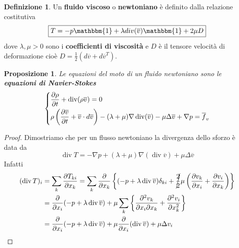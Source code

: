 \documentclass{book}
\theoremstyle{plain}
\theoremstyle{plain}
\theoremstyle{plain}
\theoremstyle{plain}
\theoremstyle{plain}
\newtheorem{prop}{Proposizione}[chapter]
\theoremstyle{definition}
\newtheorem{defi}{Definizione}[chapter]
\theoremstyle{remark}
\theoremstyle{definition}
\begin{document}
\begin{defi}
    Un \textbf{fluido viscoso} o \textbf{newtoniano} è definito dalla relazione costitutiva
    \begin{displaymath}
    \boxed{
        T=-p\mathbbm{1} + \lambda div(\overline{v})\mathbbm{1}+2\mu D
        }
    \end{displaymath}
    dove $\lambda, \mu >0$ sono i \textbf{coefficienti di viscosità} e $D$ è il tensore velocità di deformazione cioè $D=\frac{1}{2}(d\overline{v}+d\overline{v}^T)$.
\end{defi}

\begin{prop}
     Le equazioni del moto di un fluido newtoniano sono le \textbf{equazioni di Navier-Stokes}
     \begin{displaymath}
         \begin{dcases}
            \frac{\partial\rho}{\partial t} + \operatorname{div}(\rho\overline{v})=0\\
            \rho\left(\frac{\partial\overline{v}}{\partial t}+\overline{v}\cdot d\overline{v}\right) -(\lambda+\mu)\nabla \operatorname{div}(\overline{v}) -\mu\Delta\overline{v} +\nabla p = \overline{f}_v
        \end{dcases}
     \end{displaymath}
\end{prop}

\begin{proof}
    Dimostriamo che per un flusso newtoniano la divergenza dello sforzo è data da
    \begin{displaymath}
        \operatorname{div}T=-\nabla p+(\lambda+\mu)\nabla(\operatorname{div}\overline{v})+\mu\Delta\overline{v}
    \end{displaymath}
    Infatti
    \[
    \begin{split}
        (\operatorname{div}T)_i&=\sum_k\frac{\partial T_{ki}}{\partial x_k}=\sum_k\frac{\partial}{\partial x_k}\left\{(-p+\lambda\operatorname{div}\overline{v})\delta_{ki}+\cancel{\frac{2}{2}}\mu\left(\frac{\partial v_k}{\partial x_i}+\frac{\partial v_i}{\partial x_k}\right)\right\} \\
        &=\frac{\partial}{\partial x_i}(-p+\lambda\operatorname{div}\overline{v})+\mu\sum_k\left\{\frac{\partial^2v_k}{\partial x_i\partial x_k}+\frac{\partial^2v_i}{\partial x_k^2}\right\} \\
        &=\frac{\partial}{\partial x_i}(-p+\lambda\operatorname{div}\overline{v})+\mu\frac{\partial}{\partial x_i}(\operatorname{div}\overline{v})+\mu\Delta v_i
    \end{split}
    \]
\end{proof}
\end{document}
